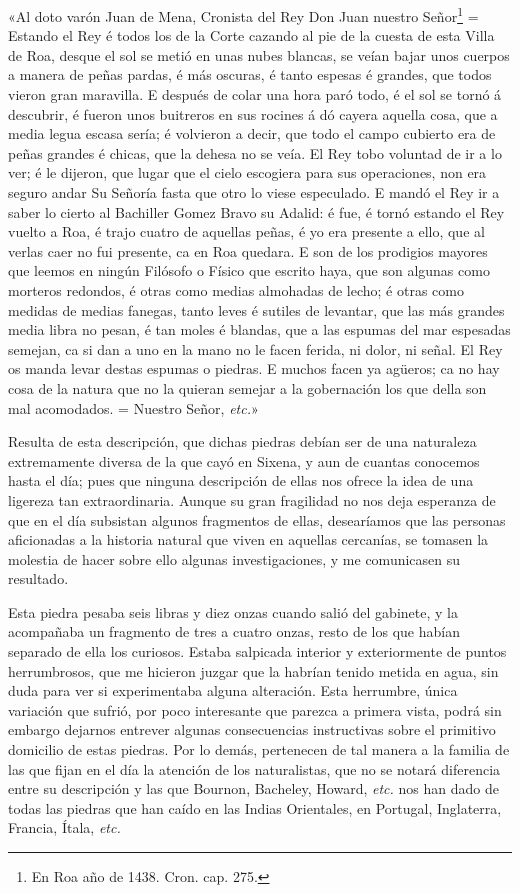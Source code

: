 \documentclass[a4paper, 11pt, oneside, polutonikogreek, spanish]{article}
\begin{document}
«Al doto varón Juan de Mena, Cronista del Rey Don Juan nuestro Señor\footnote{En Roa año de 1438. Cron. cap. 275.} = Estando el Rey é todos los de la Corte cazando al pie de la cuesta de esta Villa de Roa, desque el sol se metió en unas nubes blancas, se veían bajar unos cuerpos a manera de peñas pardas, é más oscuras, é tanto espesas é grandes, que todos vieron gran maravilla. E después de colar una hora paró todo, é el sol se tornó á descubrir, é fueron unos buitreros en sus rocines á dó cayera aquella cosa, que a media legua escasa sería; é volvieron a decir, que todo el campo cubierto era de peñas grandes é chicas, que la dehesa no se veía. El Rey tobo voluntad de ir a lo ver; é le dijeron, que lugar que el cielo escogiera para sus operaciones, non era seguro andar Su Señoría fasta que otro lo viese especulado. E mandó el Rey ir a saber lo cierto al Bachiller Gomez Bravo su Adalid: é fue, é tornó estando el Rey vuelto a Roa, é trajo cuatro de aquellas peñas, é yo era presente a ello, que al verlas caer no fui presente, ca en Roa quedara. E son de los prodigios mayores que leemos en ningún Filósofo o Físico que escrito haya, que son algunas como morteros redondos, é otras como medias almohadas de lecho; é otras como medidas de medias fanegas, tanto leves é sutiles de levantar, que las más grandes media libra no pesan, é tan moles é blandas, que a las espumas del mar espesadas semejan, ca si dan a uno en la mano no le facen ferida, ni dolor, ni señal. El Rey os manda levar destas espumas o piedras. E muchos facen ya agüeros; ca no hay cosa de la natura que no la quieran semejar a la gobernación los que della son mal acomodados. = Nuestro Señor, \emph{etc.}»

Resulta de esta descripción, que dichas piedras debían ser de una naturaleza extremamente diversa de la que cayó en Sixena, y aun de cuantas conocemos hasta el día; pues que ninguna descripción de ellas nos ofrece la idea de una ligereza tan extraordinaria. Aunque su gran fragilidad no nos deja esperanza de que en el día subsistan algunos fragmentos de ellas, desearíamos que las personas aficionadas a la historia natural que viven en aquellas cercanías, se tomasen la molestia de hacer sobre ello algunas investigaciones, y me comunicasen su resultado.

Esta piedra pesaba seis libras y diez onzas cuando salió del gabinete, y la acompañaba un fragmento de tres a cuatro onzas, resto de los que habían separado de ella los curiosos. Estaba salpicada interior y exteriormente de puntos herrumbrosos, que me hicieron juzgar que la habrían tenido metida en agua, sin duda para ver si experimentaba alguna alteración. Esta herrumbre, única variación que sufrió, por poco interesante que parezca a primera vista, podrá sin embargo dejarnos entrever algunas consecuencias instructivas sobre el primitivo domicilio de estas piedras. Por lo demás, pertenecen de tal manera a la familia de las que fijan en el día la atención de los naturalistas, que no se notará diferencia entre su descripción y las que Bournon, Bacheley, Howard, \emph{etc.} nos han dado de todas las piedras que han caído en las Indias Orientales, en Portugal, Inglaterra, Francia, Ítala, \emph{etc.}
\end{document}
